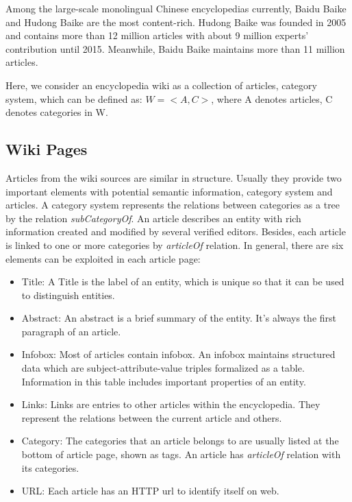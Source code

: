 \documentclass[runningheads,a4paper]{llncs}
\begin{document}
Among the large-scale monolingual Chinese encyclopedias currently, Baidu Baike and Hudong Baike are the most content-rich. Hudong Baike was founded in 2005 and contains more than 12 million articles with about 9 million experts' contribution until 2015. Meanwhile, Baidu Baike maintains more than 11 million articles.

Here, we consider an encyclopedia wiki as a collection of articles, category system, which can be defined as: $W = <A,C>$, where A denotes articles, C denotes categories in W.

\subsection{Wiki Pages}
Articles from the wiki sources are similar in structure. Usually they provide two important elements with potential semantic information, category system and articles. A category system represents the relations between categories as a tree by the relation \textit{subCategoryOf}. An article describes an entity with rich information created and modified by several verified editors. Besides, each article is linked to one or more categories by \textit{articleOf} relation. In general, there are six elements can be exploited in each article page:
\begin{itemize}
  \item Title: A Title is the label of an entity, which is unique so that it can be used to distinguish entities.
  \item Abstract: An abstract is a brief summary of the entity. It's always the first paragraph of an article.
  \item Infobox: Most of articles contain infobox. An infobox maintains structured data which are subject-attribute-value triples formalized as a table. Information in this table includes important properties of an entity.
  \item Links: Links are entries to other articles within the encyclopedia. They represent the relations between the current article and others.
  \item Category: The categories that an article belongs to are usually listed at the bottom of article page, shown as tags. An article has \textit{articleOf} relation with its categories.
  \item URL: Each article has an HTTP url to identify itself on web.
\end{itemize}
\end{document}

